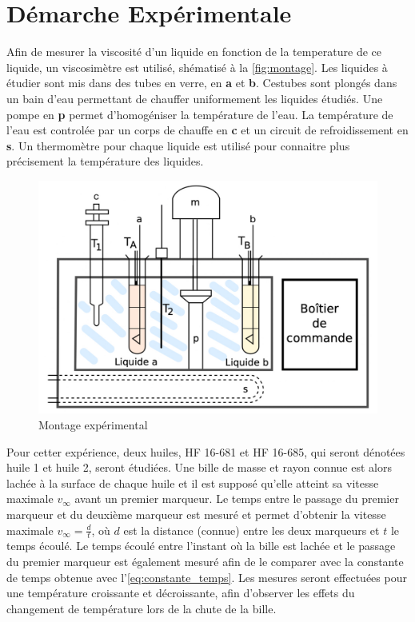 \section{Démarche Expérimentale}

Afin de mesurer la viscosité d'un liquide en fonction de la temperature de ce liquide, un viscosimètre est utilisé, shématisé à la \autoref{fig:montage}. Les liquides à étudier sont mis dans des tubes en verre, en \textbf{a} et \textbf{b}. Cestubes sont plongés dans un bain d'eau permettant de chauffer uniformement les liquides étudiés. Une pompe en \textbf{p} permet d'homogéniser la température de l'eau. La température de l'eau est controlée par un corps de chauffe en \textbf{c} et un circuit de refroidissement en \textbf{s}. Un thermomètre pour chaque liquide est utilisé pour connaitre plus précisement la température des liquides.

\begin{figure}[h]
    \centering
    \includegraphics[width=0.8\linewidth]{figures/montage.png}
    \caption{Montage expérimental \cite{notice}}
    \label{fig:montage}
\end{figure}

Pour cetter expérience, deux huiles, HF 16-681 et HF 16-685, qui seront dénotées huile 1 et huile 2, seront étudiées. Une bille de masse et rayon connue est alors lachée à la surface de chaque huile et il est supposé qu'elle atteint sa vitesse maximale \(v_\infty\) avant un premier marqueur. Le temps entre le passage du premier marqueur et du deuxième marqueur est mesuré et permet d'obtenir la vitesse maximale \(v_\infty = \frac{d}{t}\), où \(d\) est la distance (connue) entre les deux marqueurs et \(t\) le temps écoulé. Le temps écoulé entre l'instant où la bille est lachée et le passage du premier marqueur est également mesuré afin de le comparer avec la constante de temps obtenue avec l'\autoref{eq:constante_temps}. Les mesures seront effectuées pour une température croissante et décroissante, afin d'observer les effets du changement de température lors de la chute de la bille.
